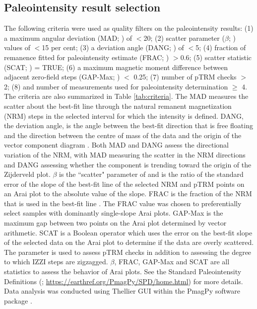 \documentclass[9pt,twocolumn,twoside,lineno]{pnas-new}
\begin{document}
{%

\subsection*{Paleointensity result selection}
The following criteria were used as quality filters on the paleointensity results: (1) a maximum angular deviation (MAD; ) of $<$20\textdegree; (2) scatter parameter ($\beta$; ) values of $<$15 per cent; (3) a deviation angle (DANG; ) of $<$5\textdegree; (4) fraction of remanence fitted for paleointensity estimate (FRAC; ) $>$0.6; (5) scatter statistic (SCAT; ) = TRUE; (6) a maximum magnetic moment difference between adjacent zero-field steps (GAP-Max; ) $<$ 0.25; (7) number of pTRM checks $>$ 2; (8) and number of measurements used for paleointensity determination $\geq$ 4. The criteria are also summarized in Table \ref{tab:criteria}. The MAD measures the scatter about the best-fit line through the natural remanent magnetization (NRM) steps in the selected interval for which the intensity is defined. DANG, the deviation angle, is the angle between the best-fit direction that is free floating and the direction between the centre of mass of the data and the origin of the vector component diagram \cite{Tauxe2004a}. Both MAD and DANG assess the directional variation of the NRM, with MAD measuring the scatter in the NRM directions and DANG assessing whether the component is trending toward the origin of the Zijderveld plot. $\beta$ is the ``scatter" parameter of  and is the ratio of the standard error of the slope of the best-fit line of the selected NRM and pTRM points on an Arai plot to the absolute value of the slope. FRAC is the fraction of the NRM that is used in the best-fit line \cite{Shaar2013a}. The FRAC value was chosen to preferentially select samples with dominantly single-slope Arai plots. GAP-Max is the maximum gap between two points on the Arai plot determined by vector arithmetic. SCAT is a Boolean operator which uses the error on the best-fit slope of the selected data on the Arai plot to determine if the data are overly scattered. The parameter is used to assess pTRM checks in addition to assessing the degree to which IZZI steps are zigzagged. $\beta$, FRAC, GAP-Max and SCAT are all statistics to assess the behavior of Arai plots. See the Standard Paleointensity Definitions (; \url{https://earthref.org/PmagPy/SPD/home.html}) for more details. Data analysis was conducted using Thellier GUI \cite{Shaar2013a} within the PmagPy software package \cite{Tauxe2016a}.

}
\end{document}
